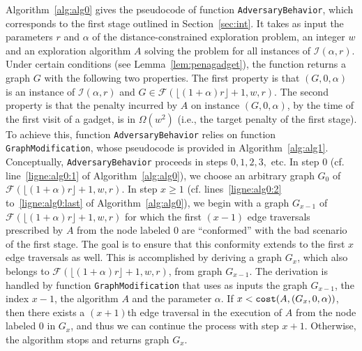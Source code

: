 \documentclass[11pt]{article}
\begin{document}
{Algorithm~\ref{alg:alg0} gives the pseudocode of function {\tt AdversaryBehavior}, which corresponds to the first stage outlined in Section~\ref{sec:int}. It takes as input the parameters $r$ and $\alpha$ of the distance-constrained exploration problem, an integer $w$ and an exploration algorithm $A$ solving the problem for all instances of $\mathcal{I}(\alpha,r)$. Under certain conditions (see Lemma~\ref{lem:penagadget}), the function returns a graph $G$ with the following two properties. The first property is that $(G,0,\alpha)$ is an instance of $\mathcal{I}(\alpha,r)$ and $G\in\mathcal{F}(\lfloor(1+\alpha)r\rfloor+1,w,r)$. The second property is that the penalty incurred by $A$ on instance $(G,0,\alpha)$, by the time of the first visit of a gadget, is in $\Omega(w^2)$ (i.e., the target penalty of the first stage). To achieve this, function {\tt AdversaryBehavior} relies on function {\tt GraphModification}, whose pseudocode is provided in Algorithm~\ref{alg:alg1}. Conceptually, {\tt AdversaryBehavior} proceeds in steps $0,1,2,3,$ etc. In step $0$ (cf. line~\ref{ligne:alg0:1} of Algorithm~\ref{alg:alg0}), we choose an arbitrary graph $G_0$ of $\mathcal{F}(\lfloor(1+\alpha)r\rfloor+1,w,r)$. In step $x\geq1$ (cf. lines~\ref{ligne:alg0:2} to~\ref{ligne:alg0:last} of Algorithm~\ref{alg:alg0}), we begin with a graph $G_{x-1}$ of $\mathcal{F}(\lfloor(1+\alpha)r\rfloor+1,w,r)$ for which the first $(x-1)$ edge traversals prescribed by $A$ from the node labeled $0$ are ``conformed'' with the bad scenario of the first stage. The goal is to ensure that this conformity extends to the first $x$ edge traversals as well. This is accomplished by deriving a graph $G_{x}$, which also belongs to $\mathcal{F}(\lfloor(1+\alpha)r\rfloor+1,w,r)$, from graph $G_{x-1}$. The derivation is handled by function {\tt GraphModification} that uses as inputs the graph $G_{x-1}$, the index $x-1$, the algorithm $A$ and the parameter $\alpha$. If $x<{\tt cost}(A,(G_x,0,\alpha))$, then there exists a $(x+1)$th edge traversal in the execution of $A$ from the node labeled $0$ in $G_x$, and thus we can continue the process with step $x+1$. Otherwise, the algorithm stops and returns graph $G_x$.

}
\end{document}
